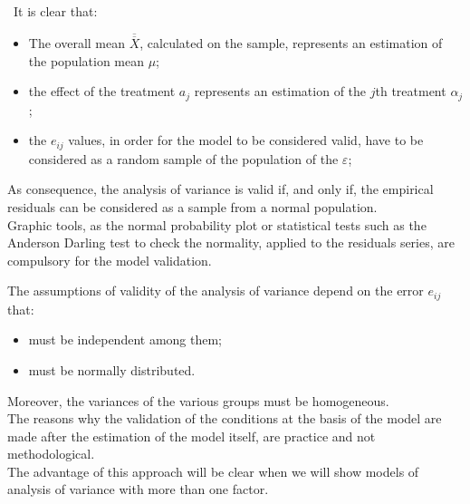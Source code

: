\begin{frame}
  \begin{small}
    \vspace*{.25cm} 
    \ It is clear that:
    \begin{itemize}
      \item The overall mean {\boldmath $ \overline{\overline{X}} $}, calculated on the sample, represents an estimation of the population mean {\boldmath $ \mu $};
      \item the effect of the treatment $a_j$ represents an estimation of the $ j $th treatment {\boldmath $ \alpha_j $};
      \item the {\boldmath $ e_{ij} $} values, in order for the model to be considered valid, have to be considered as a random sample of the population of the $\varepsilon$;
    \end{itemize}
    As consequence, the analysis of variance is valid if, and only if, the empirical residuals can be considered as a sample from a normal population. \\
    Graphic tools, as the normal probability plot or statistical tests such as the Anderson Darling test to check the normality, applied to the residuals series, are compulsory for the model validation.
  \end{small}
\end{frame}

\begin{frame}
  \vspace*{.25cm} 
  The assumptions of validity of the analysis of variance depend on the error {\boldmath$e_{ij}$} that:
  \begin{itemize}
    \item must be independent among them;
    \item must be normally distributed.
  \end{itemize}
  \vspace*{.25cm}
  Moreover, the variances of the various groups must be homogeneous. \\
  \vspace*{.5cm}
  The reasons why the validation of the conditions at the basis of the model are made after the estimation of the model itself, are practice and not methodological.\\
  \vspace*{.5cm}
  The advantage of this approach will be clear when we will show models of analysis of variance with more than one factor.
\end{frame}

